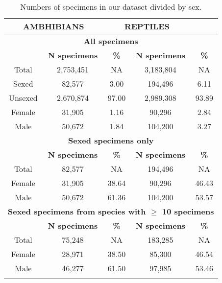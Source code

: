 
\begin{longtable}{ccccc}

\caption{Numbers of specimens in our dataset divided by sex.}\\ 
  
\hline
\multicolumn{2}{c}{\textbf{AMBHIBIANS}} & \multicolumn{2}{c}{\textbf{REPTILES}} \\
\hline
  \multicolumn{5}{c}{\textbf{All specimens}}\\  
  \hline
  & \textbf{N specimens} & \textbf{\%} & \textbf{N specimens} & \textbf{\%}\\
  \hline
  Total & 2,753,451 & NA & 3,183,804 & NA\\
  Sexed & 82,577 & 3.00 & 194,496 & 6.11\\
  Unsexed & 2,670,874 & 97.00 & 2,989,308 & 93.89\\
  Female & 31,905 & 1.16 & 90,296 & 2.84\\
  Male & 50,672 & 1.84 & 104,200 & 3.27\\
  \hline

  \multicolumn{5}{c}{\textbf{Sexed specimens only}}\\
  \hline
  & \textbf{N specimens} & \textbf{\%} & \textbf{N specimens} & \textbf{\%}\\
  \hline
  Total & 82,577 & NA & 194,496 & NA \\
  Female & 31,905 & 38.64 & 90,296 & 46.43\\
  Male & 50,672 & 61.36 & 104,200 & 53.57\\
  \hline

  \multicolumn{5}{c}{\textbf{Sexed specimens from species with $\geq$ 10 specimens}}\\
  \hline
  & \textbf{N specimens} & \textbf{\%} & \textbf{N specimens} & \textbf{\%}\\
  \hline
  Total & 75,248 & NA & 183,285 & NA\\
  Female & 28,971 & 38.50 & 85,300 & 46.54\\
  Male & 46,277 & 61.50 & 97,985 & 53.46\\
  \hline

\label{table_A1}
\end{longtable}





